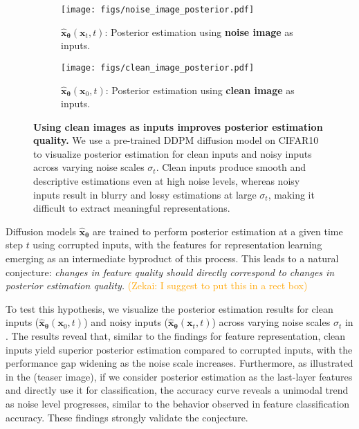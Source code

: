 {\begin{figure}[t]
    \begin{center}
    \begin{subfigure}{0.98\textwidth}
    \texttt{[image: figs/noise\_image\_posterior.pdf]}
    \caption{$\hat{\bm x}_{\bm \theta}(\bm x_t, t)$: Posterior estimation using \textbf{noise image} as inputs.} 
    \end{subfigure} \quad %
    \begin{subfigure}{0.98\textwidth}
    \texttt{[image: figs/clean\_image\_posterior.pdf]}
    \caption{$\hat{\bm x}_{\bm \theta}(\bm x_0, t)$: Posterior estimation using \textbf{clean image} as inputs.} 
    \end{subfigure}
    \end{center}
    \vspace{-0.1in}
\caption{{\color{blue}\textbf{Using clean images as inputs improves posterior estimation quality.} We use a pre-trained DDPM diffusion model on CIFAR10 to visualize posterior estimation for clean inputs and noisy inputs across varying noise scales $\sigma_t$. Clean inputs produce smooth and descriptive estimations even at high noise levels, whereas noisy inputs result in blurry and lossy estimations at large $\sigma_t$, making it difficult to extract meaningful representations.}}
\label{fig:clean_vs_noise}
\end{figure}

Diffusion models $\hat{\bm{x}}_{\bm{\theta}}$ are trained to perform posterior estimation at a given time step $t$ using corrupted inputs, with the features for representation learning emerging as an intermediate byproduct of this process. This leads to a natural conjecture:
\emph{changes in feature quality should directly correspond to changes in posterior estimation quality.}
\textcolor{orange}{(Zekai: I suggest to put this in a rect box)}


To test this hypothesis, we visualize the posterior estimation results for clean inputs ($\hat{\bm{x}}_{\bm{\theta}}(\bm{x}_0, t)$) and noisy inputs ($\hat{\bm{x}}_{\bm{\theta}}(\bm{x}_t, t)$) across varying noise scales $\sigma_t$ in . The results reveal that, similar to the findings for feature representation, clean inputs yield superior posterior estimation compared to corrupted inputs, with the performance gap widening as the noise scale increases. Furthermore, as illustrated in the (teaser image), if we consider posterior estimation as the last-layer features and directly use it for classification, the accuracy curve reveals a unimodal trend as noise level progresses, similar to the behavior observed in feature classification accuracy. These findings strongly validate the conjecture. 

}

